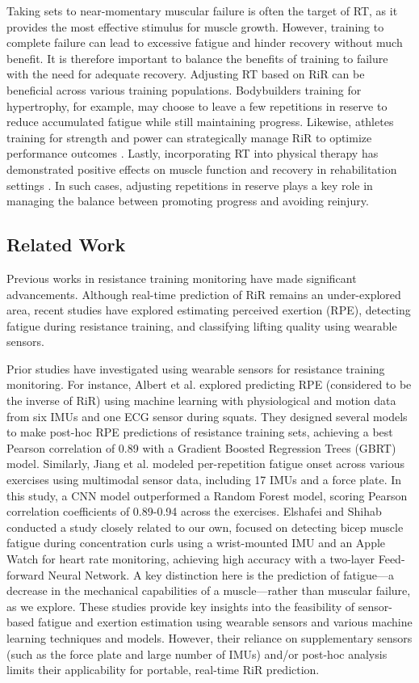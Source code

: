 \documentclass[conference]{IEEEtran}
\begin{document}
Taking sets to near-momentary muscular failure is often the target of RT, as it provides the most effective stimulus for muscle growth. However, training to complete failure can lead to excessive fatigue and hinder recovery without much benefit. It is therefore important to balance the benefits of training to failure with the need for adequate recovery. Adjusting RT based on RiR can be beneficial across various training populations. Bodybuilders training for hypertrophy, for example, may choose to leave a few repetitions in reserve to reduce accumulated fatigue while still maintaining progress. Likewise, athletes training for strength and power can strategically manage RiR to optimize performance outcomes \cite{refalo2024similar, izquierdo2006differential}. Lastly, incorporating RT into physical therapy has demonstrated positive effects on muscle function and recovery in rehabilitation settings \cite{kristensen2012resistance}. In such cases, adjusting repetitions in reserve plays a key role in managing the balance between promoting progress and avoiding reinjury.



\subsection{Related Work}
Previous works in resistance training monitoring have made significant advancements. Although real-time prediction of RiR remains an under-explored area, recent studies have explored estimating perceived exertion (RPE), detecting fatigue during resistance training, and classifying lifting quality using wearable sensors. 

Prior studies have investigated using wearable sensors for resistance training monitoring. For instance, Albert et al. \cite{albert2021using} explored predicting RPE (considered to be the inverse of RiR) using machine learning with physiological and motion data from six IMUs and one ECG sensor during squats. They designed several models to make post-hoc RPE predictions of resistance training sets, achieving a best Pearson correlation of 0.89 with a Gradient Boosted Regression Trees (GBRT) model. Similarly, Jiang et al. \cite{jiang2021data} modeled per-repetition fatigue onset across various exercises using multimodal sensor data, including 17 IMUs and a force plate. In this study, a CNN model outperformed a Random Forest model, scoring Pearson correlation coefficients of 0.89-0.94 across the exercises. Elshafei and Shihab \cite{elshafei2021towards} conducted a study closely related to our own, focused on detecting bicep muscle fatigue during concentration curls using a wrist-mounted IMU and an Apple Watch for heart rate monitoring, achieving high accuracy with a two-layer Feed-forward Neural Network. A key distinction here is the prediction of fatigue---a decrease in the mechanical capabilities of a muscle---rather than muscular failure, as we explore. These studies provide key insights into the feasibility of sensor-based fatigue and exertion estimation using wearable sensors and various machine learning techniques and models. However, their reliance on supplementary sensors (such as the force plate and large number of IMUs) and/or post-hoc analysis limits their applicability for portable, real-time RiR prediction. 
\end{document}
